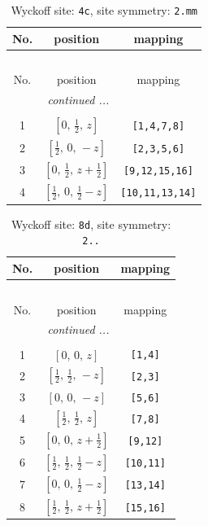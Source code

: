 \documentclass[fleqn,8pt]{jsarticle}
\begin{document}
\renewcommand{\arraystretch}{1.2}
\begin{longtable}{ccc}
\caption{Wyckoff site: {\tt 4c}, site symmetry: {\tt 2.mm}}
 \\
 \hline \hline
No. & position & mapping \\ \hline \endfirsthead

\multicolumn{2}{l}{\tablename\ \thetable{}} \\
 \hline \hline
No. & position & mapping \\ \hline \endhead

 \hline \hline
\multicolumn{2}{r}{\footnotesize\it continued ...} \\ \endfoot

 \hline \hline
\multicolumn{2}{r}{} \\ \endlastfoot

1 & $\left[ 0,\, \frac{1}{2},\, z \right]$ & {\tt [1,4,7,8]} \\ \hline
2 & $\left[ \frac{1}{2},\, 0,\, - z \right]$ & {\tt [2,3,5,6]} \\ \hline
3 & $\left[ 0,\, \frac{1}{2},\, z + \frac{1}{2} \right]$ & {\tt [9,12,15,16]} \\ \hline
4 & $\left[ \frac{1}{2},\, 0,\, \frac{1}{2} - z \right]$ & {\tt [10,11,13,14]} \\
\end{longtable}
\renewcommand{\arraystretch}{1.2}
\begin{longtable}{ccc}
\caption{Wyckoff site: {\tt 8d}, site symmetry: {\tt 2..}}
 \\
 \hline \hline
No. & position & mapping \\ \hline \endfirsthead

\multicolumn{2}{l}{\tablename\ \thetable{}} \\
 \hline \hline
No. & position & mapping \\ \hline \endhead

 \hline \hline
\multicolumn{2}{r}{\footnotesize\it continued ...} \\ \endfoot

 \hline \hline
\multicolumn{2}{r}{} \\ \endlastfoot

1 & $\left[ 0,\, 0,\, z \right]$ & {\tt [1,4]} \\ \hline
2 & $\left[ \frac{1}{2},\, \frac{1}{2},\, - z \right]$ & {\tt [2,3]} \\ \hline
3 & $\left[ 0,\, 0,\, - z \right]$ & {\tt [5,6]} \\ \hline
4 & $\left[ \frac{1}{2},\, \frac{1}{2},\, z \right]$ & {\tt [7,8]} \\ \hline
5 & $\left[ 0,\, 0,\, z + \frac{1}{2} \right]$ & {\tt [9,12]} \\ \hline
6 & $\left[ \frac{1}{2},\, \frac{1}{2},\, \frac{1}{2} - z \right]$ & {\tt [10,11]} \\ \hline
7 & $\left[ 0,\, 0,\, \frac{1}{2} - z \right]$ & {\tt [13,14]} \\ \hline
8 & $\left[ \frac{1}{2},\, \frac{1}{2},\, z + \frac{1}{2} \right]$ & {\tt [15,16]} \\
\end{longtable}
\end{document}
